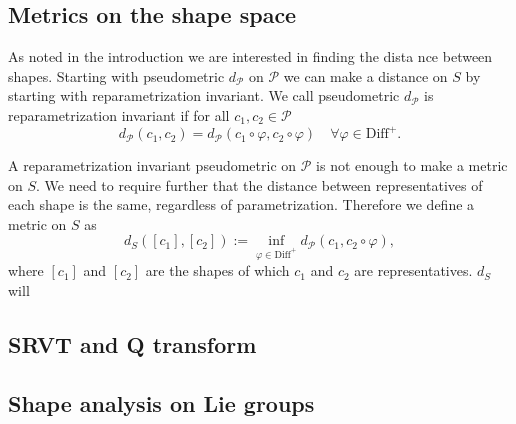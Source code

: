 \subsection{Metrics on the shape space}
As noted in the introduction we are interested in finding the dista
nce between shapes. Starting with pseudometric  \(d_{\mathcal{P}}\) on  \(\mathcal{P}\) we can make a distance on  \(S\) by starting with reparametrization invariant. We call pseudometric  \(d_{\mathcal{P}}\) is reparametrization invariant if for all  \(c_1, c_2 \in \mathcal{P}\)
\begin{equation}
  d_{\mathcal{P}}(c_1, c_2)=d_{\mathcal{P}}(c_1 \circ \varphi, c_2\circ \varphi) \quad \forall \varphi \in \text{Diff}^+.
\end{equation}

A reparametrization invariant pseudometric on  \(\mathcal{P}\) is not enough to make a metric on  \(S\). We need to require further that the distance between representatives of each shape is the same, regardless of parametrization. Therefore we define a metric on  \(S\) as
\begin{equation}
  d_S ([c_1],[c_2]) := \inf_{\varphi \in \text{Diff}^+}{  d_{\mathcal{P}}(c_1,c_2 \circ \varphi)},
\end{equation}
where  \([c_1]\) and  \([c_2]\) are the shapes of which  \(c_1\) and  \(c_2\) are representatives.  \(d_S\) will
\subsection{SRVT and Q transform}

\subsection{Shape analysis on Lie groups}\label{subsec:shape-lie}
\cite{celledoni2016}